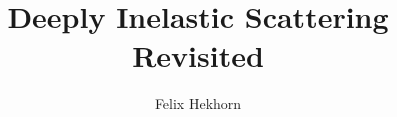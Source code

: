 \documentclass[hyperpdf,bindnopdf]{hepthesis}
\title{Deeply Inelastic Scattering Revisited}
\author{Felix Hekhorn}
\begin{document}
\begin{frontmatter}
  
\end{frontmatter}

\begin{mainmatter}
  
  
  
\end{mainmatter}

\begin{appendices}
  
\end{appendices}

\begin{backmatter}
  
\end{backmatter}

\end{document}
